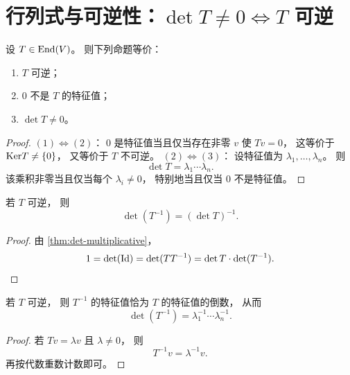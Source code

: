 \section{行列式与可逆性：\(\det T\neq 0\iff T\) 可逆}




\begin{theorem}\label{thm:det-invertible} 设 \(T\in \mathrm{End}(V)\)。 则下列命题等价：




\begin{enumerate}[label=(\arabic*), leftmargin=2.8em] \item \(T\) 可逆； \item \(0\) 不是 \(T\) 的特征值； \item \(\det T\neq 0\)。 \end{enumerate} \end{theorem}




\begin{proof} \((1)\Leftrightarrow(2)\)： \(0\) 是特征值当且仅当存在非零 \(v\) 使 \(Tv=0\)， 这等价于 \(\mathrm{Ker} T\neq \{0\}\)， 又等价于 \(T\) 不可逆。 \((2)\Leftrightarrow(3)\)： 设特征值为 \(\lambda_1,\dots,\lambda_n\)。 则 \[ \det T=\lambda_1\cdots\lambda_n. \] 该乘积非零当且仅当每个 \(\lambda_i\neq 0\)， 特别地当且仅当 \(0\) 不是特征值。 \end{proof}




\begin{corollary} 若 \(T\) 可逆， 则 \[ \det(T^{-1})=(\det T)^{-1}. \] \end{corollary}




\begin{proof} 由 \cref{thm:det-multiplicative}， \[ 1=\det(\mathrm{Id})=\det(TT^{-1})=\det T\cdot \det(T^{-1}). \] \end{proof}




\begin{corollary} 若 \(T\) 可逆， 则 \(T^{-1}\) 的特征值恰为 \(T\) 的特征值的倒数， 从而 \[ \det(T^{-1}) = \lambda_1^{-1}\cdots \lambda_n^{-1}. \] \end{corollary}




\begin{proof} 若 \(Tv=\lambda v\) 且 \(\lambda\neq0\)， 则 \[ T^{-1}v=\lambda^{-1}v. \] 再按代数重数计数即可。 \end{proof}




